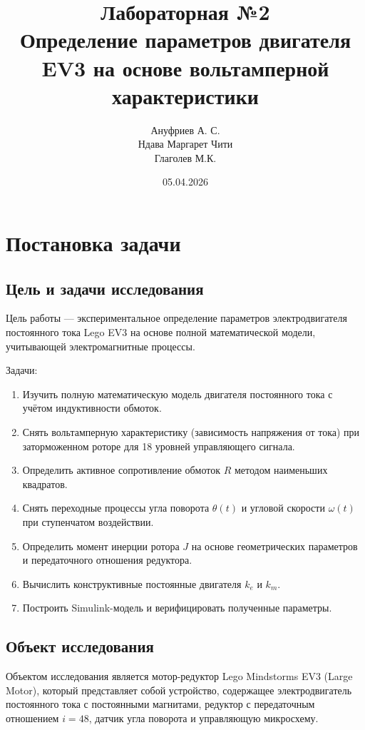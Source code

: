 \documentclass[a4paper, 12pt]{article}
\title{
    Лабораторная №2\\
    Определение параметров двигателя EV3 на основе вольтамперной характеристики
}
\author{Ануфриев А. С.\\Ндава Маргарет Чити\\Глаголев М.К.}
\affil{
    465029, \href{https://t.me/me_and_no_oneelse}{@me\_and\_no\_oneelse}\\
    505413, \href{https://t.me/margaritaanybody}{@margaritaanybody}\\
    504722, \href{https://t.me/R07331821}{@R07331821}}
\date{05.04.2026}
\begin{document}
    \newpage
    \maketitle
    \newpage
    \tableofcontents
    \newpage


\section{Постановка задачи}

\subsection{Цель и задачи исследования}

Цель работы — экспериментальное определение параметров электродвигателя постоянного тока Lego EV3 на основе полной математической модели, учитывающей электромагнитные процессы.

Задачи:
\begin{enumerate}
    \item Изучить полную математическую модель двигателя постоянного тока с учётом индуктивности обмоток.
    \item Снять вольтамперную характеристику (зависимость напряжения от тока) при заторможенном роторе для 18 уровней управляющего сигнала.
    \item Определить активное сопротивление обмоток $R$ методом наименьших квадратов.
    \item Снять переходные процессы угла поворота $\theta(t)$ и угловой скорости $\omega(t)$ при ступенчатом воздействии.
    \item Определить момент инерции ротора $J$ на основе геометрических параметров и передаточного отношения редуктора.
    \item Вычислить конструктивные постоянные двигателя $k_e$ и $k_m$.
    \item Построить Simulink-модель и верифицировать полученные параметры.
\end{enumerate}

\subsection{Объект исследования}

Объектом исследования является мотор-редуктор Lego Mindstorms EV3 (Large Motor), который представляет собой устройство, содержащее электродвигатель постоянного тока с постоянными магнитами, редуктор с передаточным отношением $i = 48$, датчик угла поворота и управляющую микросхему.
\end{document}
